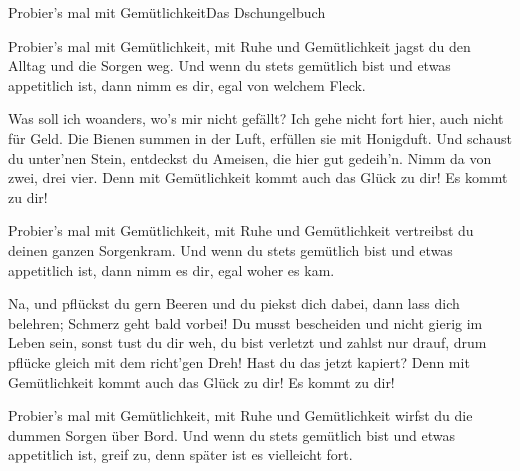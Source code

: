 \begin{song}{Probier's mal mit Gemütlichkeit}{Das Dschungelbuch}{}

Probier's mal mit Gemütlichkeit,
mit Ruhe und Gemütlichkeit jagst du den Alltag und die Sorgen weg.
Und wenn du stets gemütlich bist und etwas appetitlich ist,
dann nimm es dir, egal von welchem Fleck.

Was soll ich woanders, wo's mir nicht gefällt?
Ich gehe nicht fort hier, auch nicht für Geld.
Die Bienen summen in der Luft, erfüllen sie mit Honigduft.
Und schaust du unter'nen Stein, entdeckst du Ameisen,
die hier gut gedeih'n. Nimm da von zwei, drei vier.
Denn mit Gemütlichkeit kommt auch das Glück zu dir! Es kommt zu dir!

Probier's mal mit Gemütlichkeit,
mit Ruhe und Gemütlichkeit vertreibst du deinen ganzen Sorgenkram.
Und wenn du stets gemütlich bist und etwas appetitlich ist,
dann nimm es dir, egal woher es kam.

Na, und pflückst du gern Beeren und du piekst dich dabei,
dann lass dich belehren; Schmerz geht bald vorbei!
Du musst bescheiden und nicht gierig im Leben sein,
sonst tust du dir weh, du bist verletzt und zahlst nur drauf,
drum pflücke gleich mit dem richt'gen Dreh!
\newpage
{}
Hast du das jetzt kapiert?
Denn mit Gemütlichkeit kommt auch das Glück zu dir! Es kommt zu dir!

Probier's mal mit Gemütlichkeit,
mit Ruhe und Gemütlichkeit wirfst du die dummen Sorgen über Bord.
Und wenn du stets gemütlich bist und etwas appetitlich ist,
greif zu, denn später ist es vielleicht fort.
\end{song}